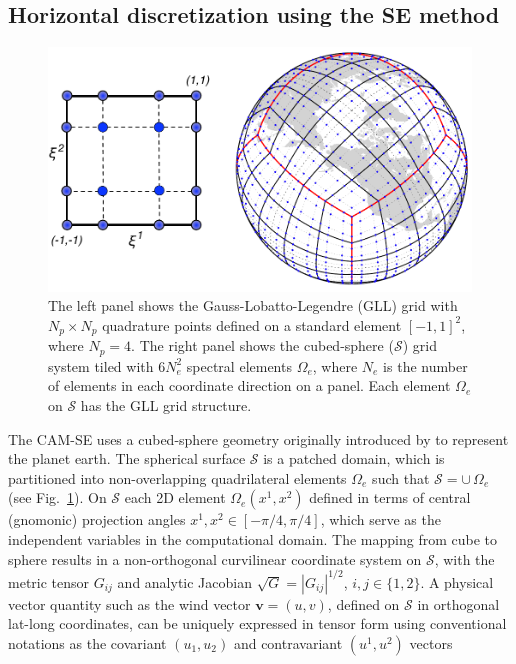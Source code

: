 \documentclass{agujournal}
\begin{document}
{\subsection{Horizontal discretization using the SE method}
  \begin{figure}[h]
\centering
 \includegraphics[scale=0.75]{figs/cs_gll4_2017}
 \caption{The left panel shows the  Gauss-Lobatto-Legendre (GLL)   grid with $ N_p \times  N_p$ quadrature points defined
 on a standard element $[-1,1]^2$, where $N_p=4$. The right panel shows the cubed-sphere ($\mathcal{S}$) grid system tiled with 
 $6 N_e^2 $ spectral elements $\Omega_e$, where $N_e$ is the number of elements  in each coordinate direction
 on a panel. 
 Each element  $\Omega_e$ on $\mathcal{S}$ has the GLL grid structure.  }
 \label{fig:gll4}
\end{figure}
    The CAM-SE 
 uses a cubed-sphere geometry  originally introduced by \cite{S1972MWR}  to represent the planet earth. The  spherical   surface 
  $\mathcal{S}$ is  a patched domain,  which is partitioned  into   non-overlapping quadrilateral elements 
 $\Omega_e$ such that $\mathcal{S} = \cup \, \Omega_e$ (see Fig.~\ref{fig:gll4}). 
  On   $\mathcal{S}$  each 2D  element $\Omega_e(x^1,x^2)$  defined in terms of
 central  (gnomonic) projection angles $x^1,x^2 \in [-\pi/4, \pi/4]$, which serve as  the independent variables in the computational domain. 
 The mapping from cube to sphere results in a non-orthogonal curvilinear  coordinate system on $\mathcal{S}$, with 
 the  metric tensor $G_{ij}$ and  analytic Jacobian $ \sqrt{G} =  |G_{ij}|^{1/2}$, $i, j \in \{1,2\}$. 
 A  physical vector quantity  such as the wind vector $\mathbf{v} = (u,v)$,  defined on  $\mathcal{S}$
 in  orthogonal lat-long coordinates,  can  be uniquely
 expressed in tensor form using conventional notations as the covariant $(u_1,u_2)$ and contravariant  $(u^1, u^2)$ vectors 
}
\end{document}

